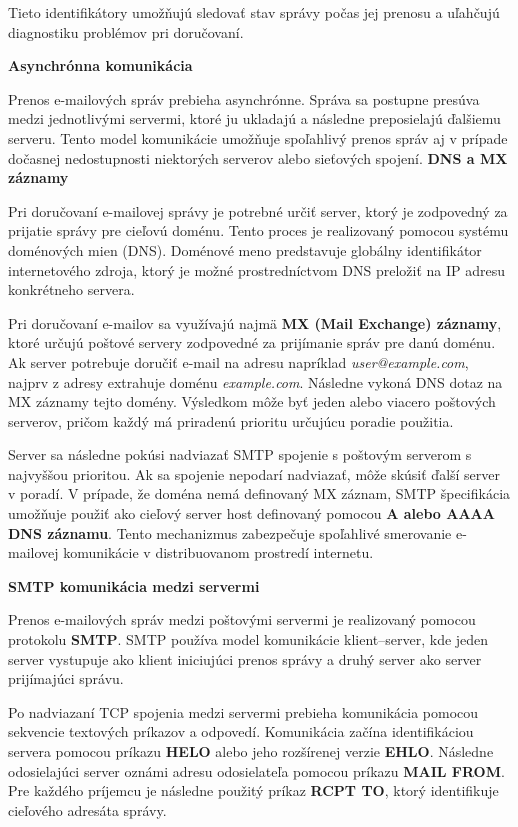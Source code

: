 \documentclass[conference]{IEEEtran}
\begin{document}
Tieto identifikátory umožňujú sledovať stav správy počas jej prenosu 
a uľahčujú diagnostiku problémov pri doručovaní.

\textbf{Asynchrónna komunikácia}

Prenos e-mailových správ prebieha asynchrónne. 
Správa sa postupne presúva medzi jednotlivými servermi, 
ktoré ju ukladajú a následne preposielajú ďalšiemu serveru. 
Tento model komunikácie umožňuje spoľahlivý prenos správ aj v prípade 
dočasnej nedostupnosti niektorých serverov alebo sieťových spojení\cite{rfc5321}.
\textbf{DNS a MX záznamy}

Pri doručovaní e-mailovej správy je potrebné určiť server, ktorý je 
zodpovedný za prijatie správy pre cieľovú doménu. Tento proces je 
realizovaný pomocou systému doménových mien (DNS). Doménové meno 
predstavuje globálny identifikátor internetového zdroja, ktorý je možné 
prostredníctvom DNS preložiť na IP adresu konkrétneho servera\cite{rfc5321}.

Pri doručovaní e-mailov sa využívajú najmä \textbf{MX (Mail Exchange) záznamy}, 
ktoré určujú poštové servery zodpovedné za prijímanie správ pre danú doménu. 
Ak server potrebuje doručiť e-mail na adresu napríklad \textit{user@example.com}, 
najprv z adresy extrahuje doménu \textit{example.com}. Následne vykoná DNS 
dotaz na MX záznamy tejto domény. Výsledkom môže byť jeden alebo viacero 
poštových serverov, pričom každý má priradenú prioritu určujúcu poradie 
použitia\cite{rfc5321}.

Server sa následne pokúsi nadviazať SMTP spojenie s poštovým serverom 
s najvyššou prioritou. Ak sa spojenie nepodarí nadviazať, môže skúsiť 
ďalší server v poradí. V prípade, že doména nemá definovaný MX záznam, 
SMTP špecifikácia umožňuje použiť ako cieľový server host definovaný 
pomocou \textbf{A alebo AAAA DNS záznamu}. Tento mechanizmus zabezpečuje 
spoľahlivé smerovanie e-mailovej komunikácie v distribuovanom prostredí 
internetu\cite{rfc5321}.

\textbf{SMTP komunikácia medzi servermi}

Prenos e-mailových správ medzi poštovými servermi je realizovaný pomocou 
protokolu \textbf{SMTP}. SMTP používa 
model komunikácie klient–server, kde jeden server vystupuje ako klient 
iniciujúci prenos správy a druhý server ako server prijímajúci správu\cite{rfc5321}.

Po nadviazaní TCP spojenia medzi servermi prebieha komunikácia pomocou 
sekvencie textových príkazov a odpovedí. Komunikácia začína identifikáciou 
servera pomocou príkazu \textbf{HELO} alebo jeho rozšírenej verzie 
\textbf{EHLO}. Následne odosielajúci server oznámi adresu odosielateľa 
pomocou príkazu \textbf{MAIL FROM}. Pre každého príjemcu je následne 
použitý príkaz \textbf{RCPT TO}, ktorý identifikuje cieľového adresáta 
správy\cite{rfc5321}.
\end{document}
